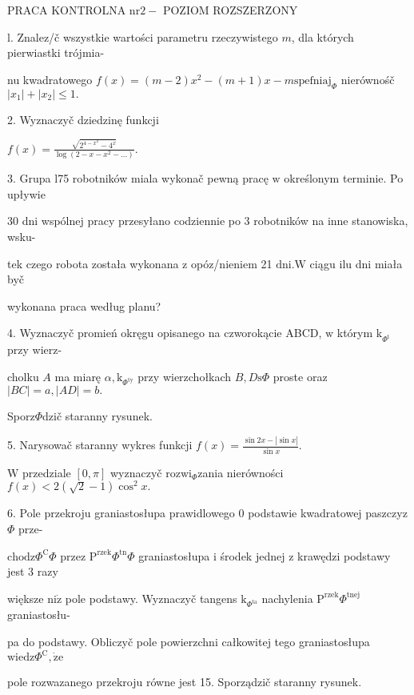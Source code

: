 \documentclass[a4paper,12pt]{article}
\begin{document}
PRACA KONTROLNA $\mathrm{n}\mathrm{r} 2-$ POZIOM ROZSZERZONY

l. Znalez/č wszystkie wartości parametru rzeczywistego $m$, dla których pierwiastki trójmia-

nu kwadratowego $f(x)=(m-2)x^{2}-(m+1)x-m \mathrm{s}\mathrm{p}\mathrm{e}\mathrm{f}\mathrm{n}\mathrm{i}\mathrm{a}\mathrm{j}_{\Phi}$ nierównośč $|x_{1}|+|x_{2}|\leq 1.$

2. Wyznaczyč dziedzinę funkcji

$f(x)=\displaystyle \frac{\sqrt{2^{4-x^{2}}-4^{x}}}{\log(2-x-x^{2}-\ldots)}.$

3. Grupa l75 robotników miala wykonač pewną pracę $\mathrm{w}$ określonym terminie. Po upływie

30 dni wspólnej pracy przesyłano codziennie po 3 robotników na inne stanowiska, wsku-

tek czego robota została wykonana $\mathrm{z}$ opóz/nieniem 21 $\mathrm{d}\mathrm{n}\mathrm{i}. \mathrm{W}$ ciągu ilu dni miała byč

wykonana praca według planu?

4. Wyznaczyč promień okręgu opisanego na czworokącie ABCD, $\mathrm{w}$ którym $\mathrm{k}_{\Phi^{\mathrm{t}}}$ przy wierz-

cholku $A$ ma miarę $\alpha, \mathrm{k}_{\Phi^{\mathrm{t}\mathrm{y}}}$ przy wierzchołkach $B,  D\mathrm{s}\Phi$ proste oraz $|BC|=a, |AD|=b.$

Sporz$\Phi$dzič staranny rysunek.

5. Narysowač staranny wykres funkcji $f(x)=\displaystyle \frac{\sin 2x-|\sin x|}{\sin x}.$

$\mathrm{W}$ przedziale $[0,\pi]$ wyznaczyč $\mathrm{r}\mathrm{o}\mathrm{z}\mathrm{w}\mathrm{i}_{\Phi}$zania nierówności $f(x)<2(\sqrt{2}-1)\cos^{2}x.$

6. Pole przekroju graniastosłupa prawidlowego $0$ podstawie kwadratowej paszczyz$\Phi$ prze-

$\mathrm{c}\mathrm{h}\mathrm{o}\mathrm{d}\mathrm{z}\Phi^{\mathrm{C}}\Phi$ przez $\mathrm{P}^{\mathrm{r}\mathrm{z}\mathrm{e}\mathrm{k}}\Phi^{\mathrm{t}\mathrm{n}}\Phi$ graniastosłupa $\mathrm{i}$ środek jednej $\mathrm{z}$ krawędzi podstawy jest 3 razy

większe $\mathrm{n}\mathrm{i}\dot{\mathrm{z}}$ pole podstawy. Wyznaczyč tangens $\mathrm{k}_{\Phi^{\mathrm{t}\mathrm{a}}}$ nachylenia $\mathrm{P}^{\mathrm{r}\mathrm{z}\mathrm{e}\mathrm{k}}\Phi^{\mathrm{t}\mathrm{n}\mathrm{e}\mathrm{j}}$ graniastosłu-

pa do podstawy. Obliczyč pole powierzchni całkowitej tego graniastosłupa $\mathrm{w}\mathrm{i}\mathrm{e}\mathrm{d}\mathrm{z}\Phi^{\mathrm{C}}, \dot{\mathrm{z}}\mathrm{e}$

pole rozwazanego przekroju równe jest 15. Sporządzič staranny rysunek.
\end{document}

